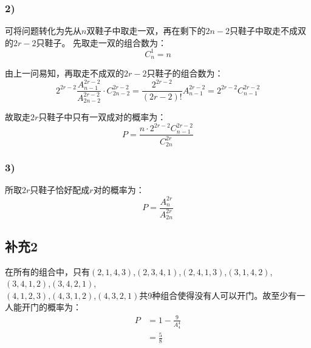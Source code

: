\documentclass[a4paper,12pt]{ctexart}
\begin{document}
\subsubsection*{2)}

可将问题转化为先从$n$双鞋子中取走一双，再在剩下的$2n-2$只鞋子中取走不成双的$2r-2$只鞋子。
先取走一双的组合数为：
\begin{equation*}
	C^1_n = n
\end{equation*}

由上一问易知，再取走不成双的$2r-2$只鞋子的组合数为：
\begin{equation*}
	2^{2r-2} \frac{A^{2r-2}_{n-1}}{A^{2r-2}_{2n-2}} \cdot C^{2r-2}_{2n-2} = \frac{2^{2r-2}}{(2r-2)!} A^{2r-2}_{n-1} = 2^{2r-2} C^{2r-2}_{n-1}
\end{equation*}

故取走$2r$只鞋子中只有一双成对的概率为：
\begin{equation*}
	P = \frac{n \cdot 2^{2r-2} C^{2r-2}_{n-1}}{C^{2r}_{2n}}
\end{equation*}

\subsubsection*{3)}

所取$2r$只鞋子恰好配成$r$对的概率为：
\begin{equation*}
	P = \frac{A^{2r}_{n}}{A^{2r}_{2n}}
\end{equation*}

\subsection*{补充2}

在所有的组合中，只有$(2,1,4,3)$,$(2,3,4,1)$,$(2,4,1,3)$,$(3,1,4,2)$,$(3,4,1,2)$,$(3,4,2,1)$,\\
$(4,1,2,3)$,$(4,3,1,2)$,$(4,3,2,1)$共9种组合使得没有人可以开门。故至少有一人能开门的概率为：
\begin{align*}
	P &= 1 - \frac{9}{A_4^4}\\
	&= \frac{5}{8}
\end{align*}
\end{document}
